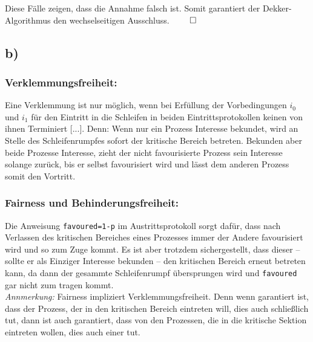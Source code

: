 \documentclass[11pt,a4paper,DIV=10,]{scrartcl}
\begin{document}
Diese Fälle zeigen, dass die Annahme falsch ist. Somit garantiert der Dekker-Algorithmus den wechselseitigen Ausschluss. $\qed$
\subsection*{b)}
\subsubsection*{Verklemmungsfreiheit:}
\glqq Eine Verklemmung ist nur möglich, wenn bei Erfüllung der Vorbedingungen $i_0$ und $i_1$ für den Eintritt in die Schleifen in beiden Eintrittsprotokollen keinen von ihnen Terminiert [...]\grqq \cite[vgl.][S. 44]{Maurer.2012}. Denn: Wenn nur ein Prozess Interesse bekundet, wird an Stelle des  Schleifenrumpfes sofort der kritische Bereich betreten. Bekunden aber beide Prozesse Interesse, zieht der nicht favourisierte Prozess sein Interesse solange zurück, bis er selbst favourisiert wird und lässt dem anderen Prozess somit den Vortritt.

\subsubsection*{Fairness und Behinderungsfreiheit:}
Die Anweisung \texttt{favoured=1-p} im Austrittsprotokoll sorgt dafür, dass nach Verlassen des kritischen Bereiches eines Prozesses immer der Andere favourisiert wird und so zum Zuge kommt. Es ist aber trotzdem sichergestellt, dass dieser -- sollte er als Einziger Interesse bekunden --  den kritischen Bereich erneut betreten kann, da dann der gesammte Schleifenrumpf übersprungen wird und \texttt{favoured} gar nicht zum tragen kommt. \\
\textit{Annmerkung:} Fairness impliziert Verklemmungsfreiheit. Denn wenn garantiert ist, dass der Prozess, der in den kritischen Bereich eintreten will, dies auch schließlich tut, dann ist auch garantiert, dass von den Prozessen, die in die kritische Sektion eintreten wollen, dies auch einer tut.
\end{document}
